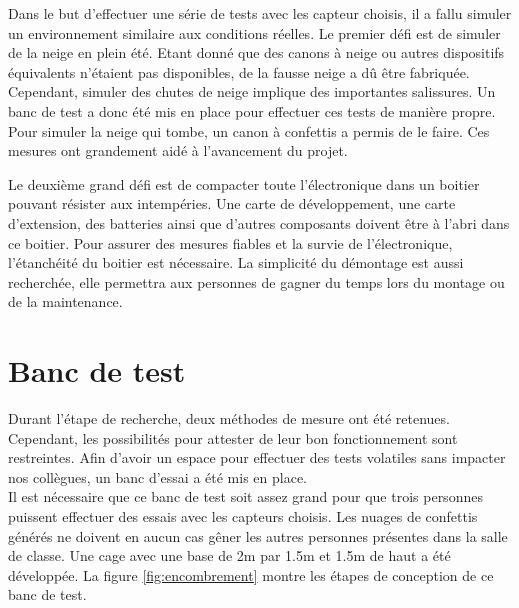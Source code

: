 Dans le but d'effectuer une série de tests avec les capteur choisis, il a fallu simuler un environnement 
similaire aux conditions réelles. Le premier défi est de simuler de la neige en plein été. Etant donné 
que des canons à neige ou autres dispositifs équivalents n’étaient pas disponibles, de la fausse neige 
a dû être fabriquée. Cependant, simuler des chutes de neige implique des importantes salissures. Un 
banc de test a donc été mis en place pour effectuer ces tests de manière propre. Pour simuler la neige 
qui tombe, un canon à confettis a permis de le faire. Ces mesures ont grandement aidé à l’avancement 
du projet.\par 
Le deuxième grand défi est de compacter toute l'électronique dans un boitier pouvant résister aux 
intempéries. Une carte de développement, une carte d'extension, des batteries ainsi que d’autres composants 
doivent être à l’abri dans ce boitier. Pour assurer des mesures fiables et la survie de l’électronique, 
l’étanchéité du boitier est nécessaire. La simplicité du démontage est aussi recherchée, elle permettra 
aux personnes de gagner du temps lors du montage ou de la maintenance.

\section{Banc de test}

Durant l’étape de recherche, deux méthodes de mesure ont été retenues. Cependant, les possibilités pour 
attester de leur bon fonctionnement sont restreintes. Afin d’avoir un espace pour effectuer des tests 
volatiles sans impacter nos collègues, un banc d’essai a été mis en place. \\
Il est nécessaire que ce banc de test soit assez grand pour que trois personnes puissent effectuer des 
essais avec les capteurs choisis. Les nuages de confettis générés ne doivent en aucun cas gêner les 
autres personnes présentes dans la salle de classe. Une cage avec une base de 2m par 1.5m et 1.5m de 
haut a été développée. La figure \ref{fig:encombrement} montre les étapes de conception de ce banc 
de test.

